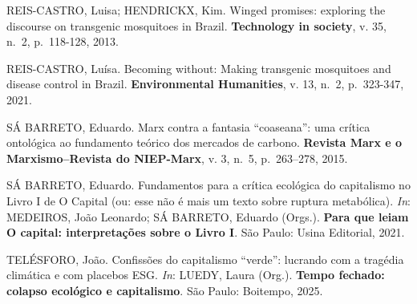 REIS-CASTRO, Luisa; HENDRICKX, Kim. Winged promises: exploring the
discourse on transgenic mosquitoes in Brazil. \textbf{Technology in
society}, v. 35, n.~2, p.~118-128, 2013.

REIS-CASTRO, Luísa. Becoming without: Making transgenic mosquitoes and
disease control in Brazil. \textbf{Environmental Humanities}, v. 13,
n.~2, p.~323-347, 2021.

SÁ BARRETO, Eduardo. Marx contra a fantasia ``coaseana'': uma crítica
ontológica ao fundamento teórico dos mercados de carbono.
\textbf{Revista Marx e o Marxismo--Revista do NIEP-Marx}, v. 3, n.~5,
p.~263--278, 2015.

SÁ BARRETO, Eduardo. Fundamentos para a crítica ecológica do capitalismo
no Livro I de O Capital (ou: esse não é mais um texto sobre ruptura
metabólica). \emph{In}: MEDEIROS, João Leonardo; SÁ BARRETO, Eduardo
(Orgs.). \textbf{Para que leiam O capital: interpretações sobre o Livro
I}. São Paulo: Usina Editorial, 2021.

TELÉSFORO, João. Confissões do capitalismo ``verde'': lucrando com a
tragédia climática e com placebos ESG. \emph{In}: LUEDY, Laura (Org.).
\textbf{Tempo fechado: colapso ecológico e capitalismo}. São Paulo:
Boitempo, 2025.
